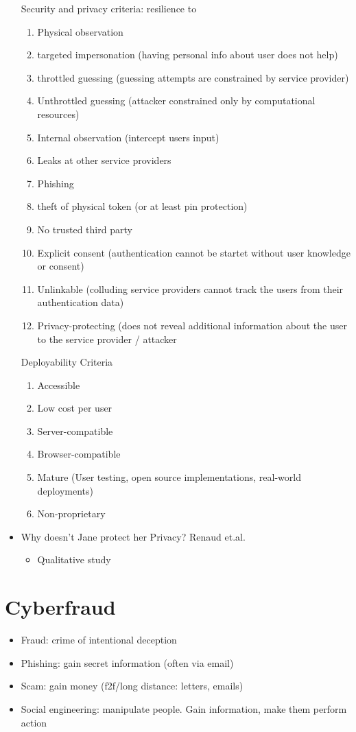 \documentclass[a4paper,12pt]{scrartcl}
\begin{document}
\begin{itemize}
		Security and privacy criteria: resilience to
		\begin{enumerate}
			\item
				Physical observation
			\item
				targeted impersonation (having personal info about user does not help)
			\item
				throttled guessing (guessing attempts are constrained by service provider)
			\item
				Unthrottled guessing (attacker constrained only by computational resources)
			\item
				Internal observation (intercept users input)
			\item
				Leaks at other service providers
			\item
				Phishing
			\item
				theft of physical token (or at least pin protection)
			\item
				No trusted third party
			\item
				Explicit consent (authentication cannot be startet without user knowledge or consent)
			\item
				Unlinkable (colluding service providers cannot track the users from their authentication data)
			\item
				Privacy-protecting (does not reveal additional information about the user to the service provider / attacker
		\end{enumerate}

		Deployability Criteria
		\begin{enumerate}
			\item
				Accessible
			\item
				Low cost per user
			\item
				Server-compatible
			\item
				Browser-compatible
			\item
				Mature (User testing, open source implementations, real-world deployments)
			\item
				Non-proprietary
		\end{enumerate}
	\item
		Why doesn't Jane protect her Privacy? Renaud et.al.
		\begin{itemize}
			\item
				Qualitative study
		\end{itemize}
\end{itemize}

\section{Cyberfraud}
\begin{itemize}
	\item
		Fraud: crime of intentional deception
	\item
		Phishing: gain secret information (often via email)
	\item
		Scam: gain money (f2f/long distance: letters, emails)
	\item
		Social engineering: manipulate people. Gain information, make them perform action
\end{itemize}
\end{document}
